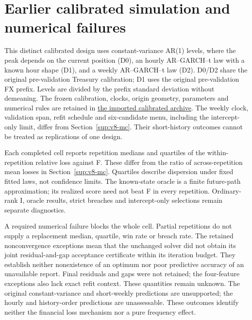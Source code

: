 \section{Earlier calibrated simulation and numerical failures}\label{sup:v9-legacy-mc}

This distinct calibrated design uses constant-variance AR(1) levels, where the
peak depends on the current position (D0), an hourly AR--GARCH--t law with a
known hour shape (D1), and a weekly AR--GARCH--t law (D2).
D0/D2 share the original pre-validation Treasury calibration; D1 uses the
original pre-validation FX prefix. Levels are divided by the prefix standard
deviation without demeaning. The frozen calibration, clocks, origin geometry,
parameters and numerical rules are retained in
\href{https://github.com/ByronLi0207/financial-mathematics-paper-20261020/tree/revision-v10/results/v9/legacy-calibrated}{the imported calibrated archive}.
The weekly clock, validation span, refit schedule and six-candidate menu,
including the intercept-only limit, differ from Section~\ref{sup:v8-mc}.
Their short-history outcomes cannot be treated as replications of one design.

Each completed cell reports repetition medians and quartiles of the
within-repetition relative loss against F. These differ from the ratio of
across-repetition mean losses in Section~\ref{sup:v8-mc}.
Quartiles describe dispersion under fixed fitted laws, not confidence limits.
The known-state oracle is a finite future-path approximation; its realized
score need not beat F in every repetition. Ordinary-rank I, oracle results,
strict breaches and intercept-only selections remain separate diagnostics.



A required numerical failure blocks the whole cell. Partial repetitions do
not supply a replacement median, quartile, win rate or breach rate.
The retained nonconvergence exceptions mean that the unchanged solver did not
obtain its joint residual-and-gap acceptance certificate within its iteration
budget. They establish neither nonexistence of an optimum nor poor predictive
accuracy of an unavailable report. Final residuals and gaps were not retained;
the four-feature exceptions also lack exact refit context. These quantities
remain unknown. The original constant-variance and short-weekly predictions
are unsupported; the hourly and history-order predictions are unassessable.
These outcomes identify neither the financial loss mechanism nor a pure
frequency effect.

